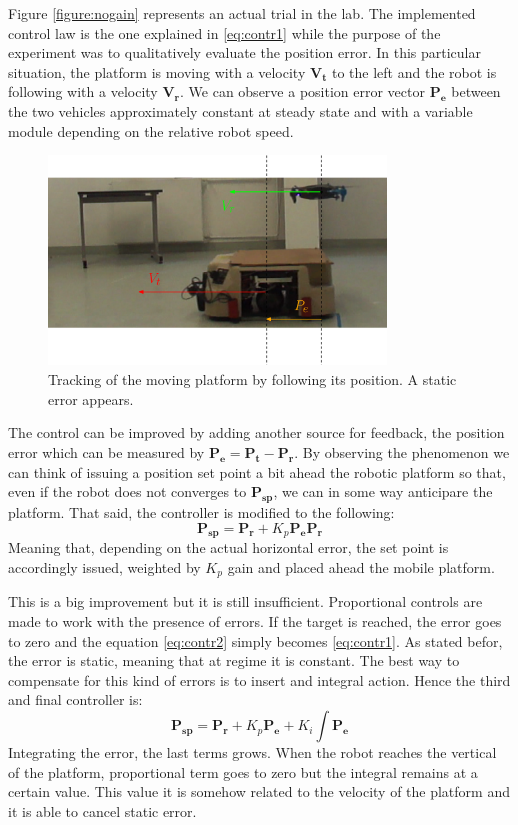 Figure \ref{figure:nogain} represents an actual trial in the lab. The implemented control law is the one explained in \ref{eq:contr1} while the purpose of the experiment was to qualitatively evaluate the position error. In this particular situation, the platform is moving with a velocity $\boldsymbol{V_t}$ to the left and the robot is following with a velocity $\boldsymbol{V_r}$. We can observe a position error vector $\boldsymbol{P_e}$ between the two vehicles approximately constant at steady state and with a variable module depending on the relative robot speed.
\begin{figure}[h]
 \centering
   \includegraphics[width = 0.8\textwidth ]{tracknogain2.eps}
    \caption[Tracking with no gain]{Tracking of the moving platform by following its position. A static error appears.}
   \label{figure:landwindow}
\end{figure}
The control can be improved by adding  another source for feedback, the position error which can be measured by $\boldsymbol{P_e} = \boldsymbol{P_{t}} - \boldsymbol{P_{r}}$. By observing the phenomenon we can think of issuing a position set point a bit ahead the robotic platform so that, even if the robot does not converges to $\boldsymbol{P_{sp}}$, we can in some way anticipare the platform. That said, the controller is modified to the following:
\begin{equation}
\boldsymbol{P_{sp}} = \boldsymbol{P_{r}} + K_p \boldsymbol{P_e} \boldsymbol{P_{r}}
\label{eq:contr2}
\end{equation}
Meaning that, depending on the actual horizontal error, the set point is accordingly issued, weighted by $K_p$ gain and placed ahead the mobile platform. 

This is a big improvement but it is still insufficient. Proportional controls are made to work with the presence of errors. If the target is reached, the error goes to zero and the equation \ref{eq:contr2} simply becomes \ref{eq:contr1}. As stated befor, the error is static, meaning that at regime it is constant. The best way to compensate for this kind of errors is to insert and integral action. Hence the third and final controller is:
\begin{equation}
\boldsymbol{P_{sp}} = \boldsymbol{P_{r}} + K_p \boldsymbol{P_e} +  K_i \int \boldsymbol{P_e}
\label{eq:contr3}
\end{equation}
Integrating the error, the last terms grows. When the robot reaches the vertical of the platform, proportional term goes to zero but the integral remains at a certain value. This value it is somehow related to the velocity of the platform and it is able to cancel static error.


